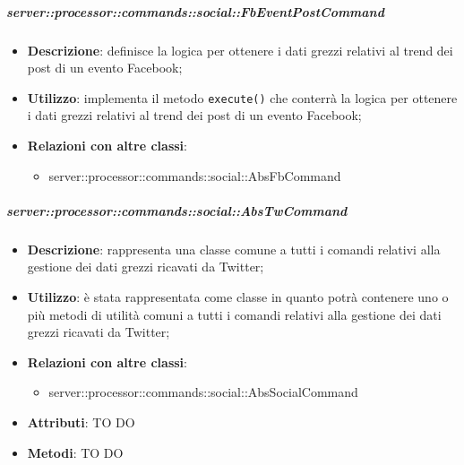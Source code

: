         \subparagraph{server::processor::commands::social::FbEventPostCommand} %
        \label{subp:bdsm_app_server_processor_commands_social_fbeventpostcommand}
        \begin{itemize}
          \item \textbf{Descrizione}: definisce la logica per ottenere i dati grezzi relativi al trend dei post di un evento Facebook;
          \item \textbf{Utilizzo}: implementa il metodo \texttt{execute()} che conterrà la logica per ottenere i dati grezzi relativi al trend dei post di un evento Facebook;
          \item \textbf{Relazioni con altre classi}:
            \begin{itemize}
              \item server::processor::commands::social::AbsFbCommand
            \end{itemize}
        \end{itemize}


        \subparagraph{server::processor::commands::social::AbsTwCommand} %
        \label{subp:bdsm_app_server_processor_commands_social::abstwcommand}
        \begin{itemize}
          \item \textbf{Descrizione}: rappresenta una classe comune a tutti i comandi relativi alla gestione dei dati grezzi ricavati da Twitter;
          \item \textbf{Utilizzo}: è stata rappresentata come classe in quanto potrà contenere uno o più metodi di utilità comuni a tutti i comandi relativi alla gestione dei dati grezzi ricavati da Twitter;
          \item \textbf{Relazioni con altre classi}:
            \begin{itemize}
              \item server::processor::commands::social::AbsSocialCommand
            \end{itemize}
			\item \textbf{Attributi}: TO DO
			\item \textbf{Metodi}: TO DO
        \end{itemize}

